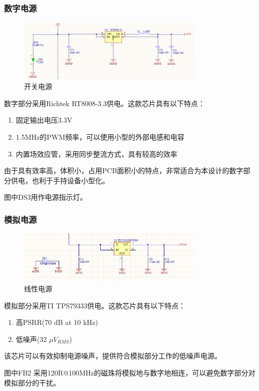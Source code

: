 \documentclass[16pt,a4paper]{article}
\begin{document}
\subsubsection{数字电源}
\begin{figure}[H]
\centering
\includegraphics[width=0.8\textwidth]{power1.png}
\caption{开关电源} 
\end{figure}
数字部分采用Richtek RT8008-3.3供电。这款芯片具有以下特点：
\begin{enumerate}
\item 固定输出电压3.3V
\item 1.5MHz的PWM频率，可以使用小型的外部电感和电容
\item 内置场效应管，采用同步整流方式，具有较高的效率
\end{enumerate}\par
由于具有效率高，体积小，占用PCB面积小的特点，非常适合为本设计的数字部分供电，也利于手持设备小型化。\par
图中DS3用作电源指示灯。

\subsubsection{模拟电源}
\begin{figure}[H]
\centering
\includegraphics[width=0.8\textwidth]{power2.png}
\caption{线性电源} 
\end{figure}
模拟部分采用TI TPS79333供电。这款芯片具有以下特点：

\begin{enumerate}
\item 高PSRR(70 dB at 10 kHz)
\item 低噪声(32 $\mu V_{RMS}$)
\end{enumerate}\par
该芯片可以有效抑制电源噪声，提供符合模拟部分工作的低噪声电源。\par
图中FB2 采用120R@100MHz的磁珠将模拟地与数字地相连，可以避免数字部分对模拟部分的干扰。
\end{document}
